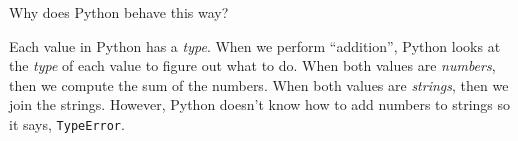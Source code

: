 \question Why does Python behave this way?

\begin{solution}[1in]
Each value in Python has a \emph{type}. When we perform ``addition'', Python looks at the \emph{type} of each value to figure out what to do. When both values are \emph{numbers}, then we compute the sum of the numbers. When both values are \emph{strings}, then we join the strings. However, Python doesn't know how to add numbers to strings so it says, \texttt{TypeError}.
\end{solution}
